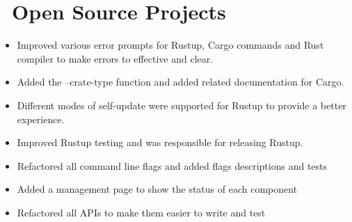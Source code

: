\documentclass{resume}
\newcommand{\en}[1]{#1}
\newcommand{\zh}[1]{}
\begin{document}
\section{\faGithubAlt\ \en{Open Source Projects}\zh{开源项目}}
\en{}
\zh{\role{活跃维护者}{\href{https://github.com/search?q=repo:rust-lang/cargo+repo:rust-lang/rustup+repo:rust-lang/rust+author:hi-rustin&type=commits}{380+ 个提交}}}
\begin{itemize}
      \item \en{Improved various error prompts for Rustup, Cargo commands and Rust compiler to make errors to effective and clear.}
            \zh{改善了大量 Rustup、Cargo 命令和 Rust 编译器的错误提示，让错误更有效更清晰。}
      \item \en{Added the --crate-type function and added related documentation for Cargo.}
            \zh{为 Cargo 添加了 --crate-type 功能和相关文档。}
      \item \en{Different modes of self-update were supported for Rustup to provide a better experience.}
            \zh{为 Rustup 支持了 self-update 的不同模式来提供更好的使用体验。}
      \item \en{Improved Rustup testing and was responsible for releasing Rustup.}
            \zh{改善 Rustup 测试，负责发布 Rustup。}
\end{itemize}

\en{}
\zh{\role{活跃贡献者}{\href{https://github.com/grafana/phlare/commits?author=hi-rustin}{28+ 个提交}}}
\begin{itemize}
      \item \en{Refactored all command line flags and added flags descriptions and tests}
            \zh{重构了所有命令行参数，并添加了参数说明和测试}
      \item \en{Added a management page to show the status of each component}
            \zh{添加了管理页面展示各组件状态}
      \item \en{Refactored all APIs to make them easier to write and test}
            \zh{重构了所有 API 使其更容易编写和测试}
\end{itemize}
\end{document}
